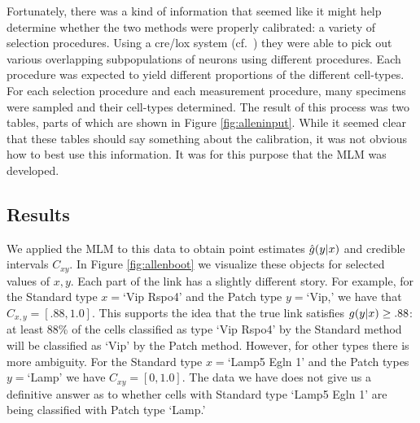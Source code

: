 Fortunately, there was a kind of information that seemed like it might help determine whether the two methods were properly calibrated: a variety of selection procedures.  Using a cre/lox system (cf.\ \citep{tasic2017shared}) they were able to pick out various overlapping subpopulations of neurons using different procedures.  Each procedure was expected to yield different proportions of the different cell-types.  For each selection procedure and each measurement procedure, many specimens were sampled and their cell-types determined.  The result of this process was two tables, parts of which are shown in Figure \ref{fig:alleninput}.  While it seemed clear that these tables should say something about the calibration, it was not obvious how to best use this information.  It was for this purpose that the MLM was developed.

\subsection{Results}


We applied the MLM to this data to obtain point estimates $\hat {g}(y|x)$ and credible intervals $C_{x y}$.  In Figure \ref{fig:allenboot} we visualize these objects for selected values of $x,y$.  Each part of the link has a slightly different story.  For example, for the Standard type $x=$`Vip Rspo4' and the Patch type $y=$`Vip,' we have that $C_{x,y}=[.88,1.0]$.  This supports the idea that the true link satisfies $g(y|x)\geq .88$: at least 88\% of the cells classified as type `Vip Rspo4' by the Standard method will be classified as `Vip' by the Patch method.  However, for other types there is more ambiguity.  For the Standard type $x=$`Lamp5 Egln 1' and the Patch types $y=$`Lamp' we have $C_{x y}=[0,1.0]$.  The data we have does not give us a definitive answer as to whether cells with Standard type `Lamp5 Egln 1' are being classified with Patch type `Lamp.'

